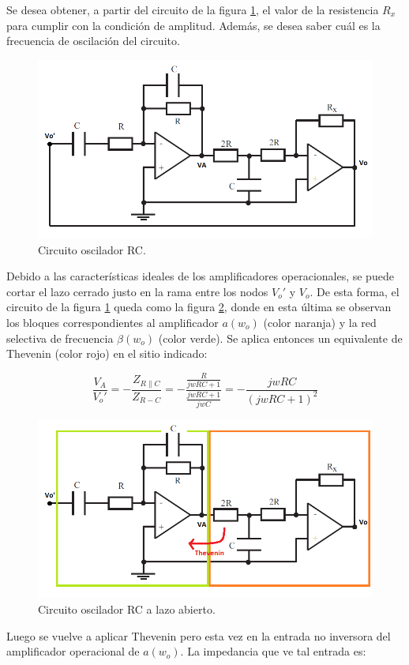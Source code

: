 Se desea obtener, a partir del circuito de la figura \ref{2.0}, el valor de la resistencia $R_x$ para cumplir con la condición de amplitud. Además, se desea saber cuál es la frecuencia de oscilación del circuito. 

\begin{figure}[H]
\centering
\includegraphics[width=0.6\linewidth]{images/circuito_1.png}
\caption{Circuito oscilador RC.}
\label{2.0}
\end{figure}

Debido a las características ideales de los amplificadores operacionales, se puede cortar el lazo cerrado justo en la rama entre los nodos $V_o'$ y $V_o$. De esta forma, el circuito de la figura \ref{2.0} queda como la figura \ref{2.1}, donde en esta última se observan los bloques correspondientes al amplificador $a(w_o)$ (color naranja) y la red selectiva de frecuencia $\beta (w_o)$ (color verde). Se aplica entonces un equivalente de Thevenin (color rojo) en el sitio indicado:

\begin{equation}
\label{eq:2.0}
\frac{V_A}{V_o'} = - \frac{Z_{R\parallel C}}{Z_{R-C}}= - \frac{\frac{R}{j wRC+1}}{\frac{j wRC+1}{j wC}} = - \frac{jwRC}{(jwRC+1)^2}
\end{equation}


\begin{figure}[H]
\centering
\includegraphics[width=0.6\linewidth]{images/circuito_1_1.png}
\caption{Circuito oscilador RC a lazo abierto.}
\label{2.1}
\end{figure}

Luego se vuelve a aplicar Thevenin pero esta vez en la entrada no inversora del amplificador operacional de $a(w_o)$. La impedancia que ve tal entrada es:


